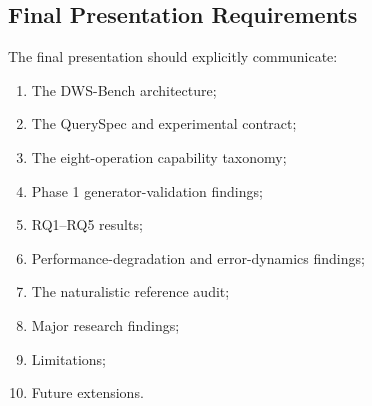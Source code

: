 \documentclass{iutbscthesis}
\begin{document}
\begin{appendices}
\section{Final Presentation Requirements}
The final presentation should explicitly communicate:
\begin{enumerate}[noitemsep]
    \item The DWS-Bench architecture;
    \item The QuerySpec and experimental contract;
    \item The eight-operation capability taxonomy;
    \item Phase 1 generator-validation findings;
    \item RQ1--RQ5 results;
    \item Performance-degradation and error-dynamics findings;
    \item The naturalistic reference audit;
    \item Major research findings;
    \item Limitations;
    \item Future extensions.
\end{enumerate}

\end{appendices}

\printbib
\end{document}
